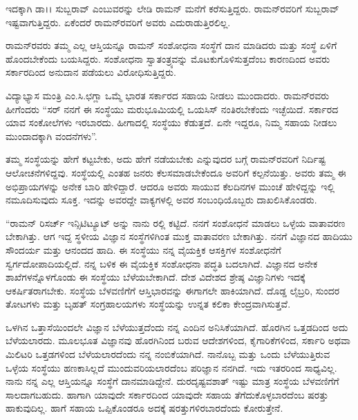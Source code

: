 ಇದಕ್ಕಾಗಿ ಡಾ।। ಸುಬ್ಬರಾವ್ ಎಂಬುವರನ್ನು ಲೇಡಿ ರಾಮನ್ ಮನೆಗೆ ಕರೆಸುತ್ತಿದ್ದರು. ರಾಮನ್‍\-ರವರಿಗೆ ಸುಬ್ಬರಾವ್ ಇಷ್ಟವಾಗುತ್ತಿದ್ದರು. ಏಕೆಂದರೆ ರಾಮನ್‍ರವರಿಗೆ ಅವರು ಎದುರಾಡುತ್ತಿರಲಿಲ್ಲ.



ರಾಮನ್‍ರವರು ತಮ್ಮ ಎಲ್ಲ ಆಸ್ತಿಯನ್ನೂ ರಾಮನ್ ಸಂಶೋಧನಾ ಸಂಸ್ಥೆಗೆ ದಾನ ಮಾಡಿದರು ಮತ್ತು ಸಂಸ್ಥೆ ಏಳಿಗೆ ಹೊಂದಬೇಕೆಂದು ಬಯಸಿದ್ದರು. ಸಂಶೋಧನಾ ಸ್ವಾತಂತ್ರ್ಯವನ್ನು ಮೊಟಕುಗೊಳಿಸುತ್ತದೆಂಬ ಕಾರಣದಿಂದ ಅವರು ಸರ್ಕಾರದಿಂದ ಅನುದಾನ ಪಡೆಯಲು ವಿರೋಧಿಸುತ್ತಿದ್ದರು.

ವಿದ್ಯಾಭ್ಯಾಸ ಮಂತ್ರಿ ಎಂ.ಸಿ.ಛಗ್ಲಾ ಒಮ್ಮೆ ಭಾರತ ಸರ್ಕಾರದ ಸಹಾಯ ನೀಡಲು ಮುಂದಾದರು. ರಾಮನ್‍ರವರು ಹೀಗೆಂದರು\enginline{-} “ಸರ್ ನನಗೆ ಈ ಸಂಸ್ಥೆಯು ಮರುಭೂಮಿಯಲ್ಲಿ ಒಯಸಿಸ್ ನಂತಿರಬೇಕೆಂದು ಇಚ್ಛೆಯಿದೆ. ಸರ್ಕಾರದ ಯಾವ ಸಂಕೋಲೆಗಳು ಇರಬಾರದು. ಹೀಗಾದಲ್ಲಿ ಸಂಸ್ಥೆಯು ಕೆಡುತ್ತದೆ. ಏನೇ ಇದ್ದರೂ, ನಿಮ್ಮ ಸಹಾಯ ನೀಡಲು ಮುಂದಾದಕ್ಕಾಗಿ ವಂದನೆಗಳು”.

ತಮ್ಮ ಸಂಸ್ಥೆಯನ್ನು ಹೇಗೆ ಕಟ್ಟಬೇಕು, ಅದು ಹೇಗೆ ನಡೆಯಬೇಕು ಎನ್ನುವುದರ ಬಗ್ಗೆ ರಾಮನ್‍ರವರಿಗೆ ನಿರ್ದಿಷ್ಟ ಆಲೋಚನೆಗಳಿದ್ದವು. ಸಂಸ್ಥೆಯಲ್ಲಿ ಎಂತಹ ಜನರು ಕೆಲಸಮಾಡಬೇಕೆಂದೂ ಅವರಿಗೆ ಕಲ್ಪನೆಯಿತ್ತು. ಅವರು ತಮ್ಮ ಈ ಅಭಿಪ್ರಾಯಗಳನ್ನು ಅನೇಕ ಬಾರಿ ಹೇಳಿದ್ದಾರೆ. ಆದರೂ ಅವರು ಸಾಯುವ ಕೆಲದಿನಗಳ ಮುಂಚೆ ಹೇಳಿದ್ದನ್ನು ಇಲ್ಲಿ ನಮೂದಿಸುವುದು ಸೂಕ್ತ. ಇದನ್ನು ಅವರದ್ದೇ ವಾಕ್ಯಗಳಲ್ಲಿ ಅವರ ಸಂಬಂಧಿಯೊಬ್ಬರು ದಾಖಲಿಸಿಕೊಂಡರು.

“ರಾಮನ್ ರಿಸರ್ಚ್ ಇನ್ಸಿಟಿಟ್ಯೂಟ್ ಅನ್ನು ನಾನು ರಲ್ಲಿ ಕಟ್ಟಿದೆ. ನನಗೆ ಸಂಶೋಧನೆ ಮಾಡಲು ಒಳ್ಳೆಯ ವಾತಾವರಣ ಬೇಕಾಗಿತ್ತು. ಆಗ ಇದ್ದ ಸ್ಥಳೀಯ ವಿಜ್ಞಾನ ಸಂಸ್ಥೆಗಳಿಗಿಂತ ಮುಕ್ತ ವಾತಾವರಣ ಬೇಕಾಗಿತ್ತು. ನನಗೆ ವಿಜ್ಞಾನದ ಹಾದಿಯು ಸೌಂದರ್ಯ ಮತ್ತು ಆನಂದದ ಹಾದಿ. ಈ ಸಂಸ್ಥೆಯು ನನ್ನ ವೈಯಕ್ತಿಕ ಆಸಕ್ತಿಗಳ ಸಂಶೋಧನೆಗೆ ಸ್ವರ್ಗದೋಪಾದಿಯಲ್ಲಿದೆ. ನನ್ನ ಬಳಿಕ ಈ ವೈಯಕ್ತಿಕ ಸಂಶೋಧನಾ ಪದ್ಧತಿ ಬದಲಾಗಿದೆ. ವಿಜ್ಞಾನದ ಅನೇಕ ಶಾಖೆಗಳನ್ನೊಳಗೊಂಡು ಈ ಸಂಸ್ಥೆಯು ಬೆಳೆಯಬೇಕಾಗಿದೆ. ದೇಶ ವಿದೇಶದ ಶ್ರೇಷ್ಠ ವಿಜ್ಞಾನಿಗಳು ಇದಕ್ಕೆ ಆಕರ್ಷಿತರಾಗಬೇಕು. ಸಂಸ್ಥೆಯ ಬೆಳವಣಿಗೆಗೆ ಆಸ್ತಿಭಾರವನ್ನು ಈಗಾಗಲೇ ಹಾಕಿಯಾಗಿದೆ. ದೊಡ್ಡ ಲೈಬ್ರರಿ, ಸುಂದರ ತೋಟಗಳು ಮತ್ತು ಬೃಹತ್ ಸಂಗ್ರಹಾಲಯಗಳು ಸಂಸ್ಥೆಯನ್ನು ಉನ್ನತ ಕಲಿಕಾ ಕೇಂದ್ರವಾಗಿಸುತ್ತವೆ.

ಒಳಗಿನ ಒತ್ತಾಸೆಯಿಂದಲೇ ವಿಜ್ಞಾನ ಬೆಳೆಯುತ್ತದೆಂದು ನನ್ನ ಎಂದಿನ ಅನಿಸಿಕೆಯಾಗಿದೆ. ಹೊರಗಿನ ಒತ್ತಡದಿಂದ ಅದು ಬೆಳೆಯಲಾರದು. ಮೂಲಭೂತ ವಿಜ್ಞಾನವು ಹೊರಗಿನಿಂದ ಬರುವ ಆದೇಶಗಳಿಂದ, ಕೈಗಾರಿಕೆಗಳಿಂದ, ಸರ್ಕಾರಿ ಅಥವಾ ಮಿಲಿಟರಿ ಒತ್ತಡಗಳಿಂದ ಬೆಳೆಯಲಾರದೆಂದು ನನ್ನ ನಂಬಿಕೆಯಾಗಿದೆ. ನಾನೊಬ್ಬ  ಮತ್ತು ಒಂದು ಬೆಳೆಯುತ್ತಿರುವ ಒಳ್ಳೆಯ ಸಂಸ್ಥೆಯು ಹಣಕಾಸಿಲ್ಲದೆ ಮುಂದುವರಿಯಲಾರದೆಂಬ ಪರಿಜ್ಞಾನ ನನಗಿದೆ. ಇದು ಇತರರಿಂದ ಸಾಧ್ಯವಿಲ್ಲ. ನಾನು ನನ್ನ ಎಲ್ಲ ಆಸ್ತಿಯನ್ನೂ ಸಂಸ್ಥೆಗೆ ದಾನಮಾಡಿದ್ದೇನೆ. ದುರದೃಷ್ಟವಶಾತ್ ಇಷ್ಟು ಮಾತ್ರ ಸಂಸ್ಥೆಯ ಬೆಳವಣಿಗೆಗೆ ಸಾಲದಾಗಬಹುದು. ಹಾಗಾಗಿ ಯಾವುದೇ ಸರ್ಕಾರದಿಂದ ಯಾವುದೇ ಸಹಾಯ ತೆಗೆದುಕೊಳ್ಳಬಾರದೆಂಬ ಷರತ್ತು ಹಾಕುವುದಿಲ್ಲ. ಹಾಗೆ ಸಹಾಯ ಒಪ್ಪಿಕೊಂಡರೂ ಅದಕ್ಕೆ ಷರತ್ತುಗಳಿರಬಾರದೆಂದು ಕೋರುತ್ತೇನೆ.


